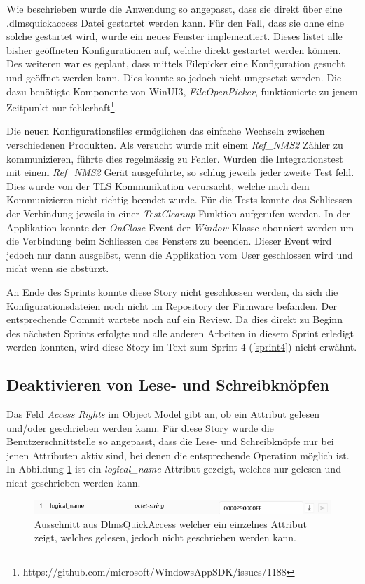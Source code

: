 Wie beschrieben wurde die Anwendung so angepasst, dass sie direkt über eine .dlmsquickaccess Datei gestartet werden kann.
Für den Fall, dass sie ohne eine solche gestartet wird, wurde ein neues Fenster implementiert.
Dieses listet alle bisher geöffneten Konfigurationen auf, welche direkt gestartet werden können.
Des weiteren war es geplant, dass mittels Filepicker eine Konfiguration gesucht und geöffnet werden kann.
Dies konnte so jedoch nicht umgesetzt werden.
Die dazu benötigte Komponente von WinUI3, \textit{FileOpenPicker}, funktionierte zu jenem Zeitpunkt nur fehlerhaft\footnote{https://github.com/microsoft/WindowsAppSDK/issues/1188}.


Die neuen Konfigurationsfiles ermöglichen das einfache Wechseln zwischen verschiedenen Produkten.
Als versucht wurde mit einem \textit{Ref\_NMS2} Zähler zu kommunizieren, führte dies regelmässig zu Fehler.
Wurden die Integrationstest mit einem \textit{Ref\_NMS2} Gerät ausgeführte, so schlug jeweils jeder zweite Test fehl.
Dies wurde von der \ac{TLS} Kommunikation verursacht, welche nach dem Kommunizieren nicht richtig beendet wurde.
Für die Tests konnte das Schliessen der Verbindung jeweils in einer \textit{TestCleanup} Funktion aufgerufen werden.
In der Applikation konnte der \textit{OnClose} Event der \textit{Window} Klasse abonniert werden um die Verbindung beim Schliessen des Fensters zu beenden.
Dieser Event wird jedoch nur dann ausgelöst, wenn die Applikation vom User geschlossen wird und nicht wenn sie abstürzt.


An Ende des Sprints konnte diese Story  nicht geschlossen werden, da sich die Konfigurationsdateien noch nicht im Repository der Firmware befanden.
Der entsprechende Commit wartete noch auf ein Review.
Da dies direkt zu Beginn des nächsten Sprints erfolgte und alle anderen Arbeiten in diesem Sprint erledigt werden konnten, wird diese Story im Text zum Sprint 4 (\ref{sprint4}) nicht erwähnt.


\subsection{Deaktivieren von Lese- und Schreibknöpfen}
Das Feld \textit{Access Rights} im Object Model gibt an, ob ein Attribut gelesen und/oder geschrieben werden kann.
Für diese Story wurde die Benutzerschnittstelle so angepasst, dass die Lese- und Schreibknöpfe nur bei jenen Attributen aktiv sind, bei denen die entsprechende Operation möglich ist.
In Abbildung \ref{fig:logicalNameAttribute} ist ein \textit{logical\_name} Attribut gezeigt, welches nur gelesen und nicht geschrieben werden kann.

\begin{figure}[H]
   \centering
   \includegraphics[width=1.0\textwidth]{gfx/logicalNameAttribute.png}
   \caption{
      Ausschnitt aus DlmsQuickAccess welcher ein einzelnes Attribut zeigt, welches gelesen, jedoch nicht geschrieben werden kann.
      }
      \label{fig:logicalNameAttribute}
   \end{figure}